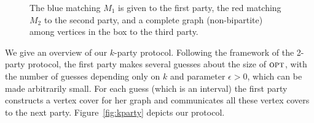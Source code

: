 \documentclass[11pt]{article}
\newcommand{\opt}{\ensuremath{\textsc{opt}}}
\begin{document}
\begin{figure}
\begin{minipage}{0.5\textwidth}
{
     }
    \end{minipage}\begin{minipage}{0.45\textwidth} \centering
          \caption{The blue matching $M_1$ is given to the first party, the red matching $M_2$ to the second party, and a complete graph (non-bipartite) among vertices in the box to the third party.}
            \label{fig:example_graph}
    \end{minipage}
\end{figure} 
We give an overview of our $k$-party protocol.  Following
the framework of the 2-party protocol, the first party makes several
guesses about the size of $\opt$, with the number of guesses depending
only on $k$ and parameter $\epsilon > 0$, which can be made
arbitrarily small.  For each guess (which is an interval) the first party constructs a vertex cover for her graph and communicates
all these vertex covers to the next party. Figure~\ref{fig:kparty} depicts our protocol. 
\end{document}
